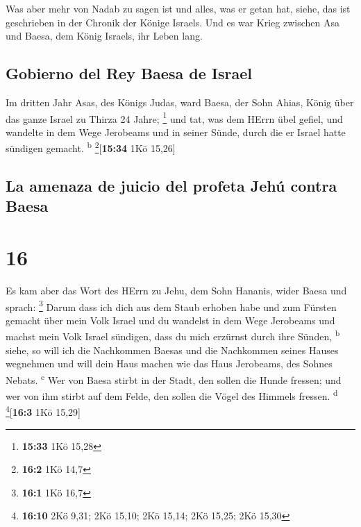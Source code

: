  Was aber mehr von Nadab zu sagen ist und alles, was er
getan hat, siehe, das ist geschrieben in der Chronik der Könige Israels.
 Und es war Krieg zwischen Asa und Baesa, dem König
Israels, ihr Leben lang.

\hypertarget{gobierno-del-rey-baesa-de-israel}{%
\subsection{Gobierno del Rey Baesa de
Israel}\label{gobierno-del-rey-baesa-de-israel}}

 Im dritten Jahr Asas, des Königs Judas, ward Baesa, der
Sohn Ahias, König über das ganze Israel zu Thirza 24 Jahre; \footnote{\textbf{15:33}
  1Kö 15,28}  und tat, was dem HErrn übel gefiel, und
wandelte in dem Wege Jerobeams und in seiner Sünde, durch die er Israel
hatte sündigen gemacht. \textsuperscript{b} \footnote{\textbf{16:2} 1Kö
  14,7}{[}\textbf{15:34} 1Kö 15,26{]}

\hypertarget{la-amenaza-de-juicio-del-profeta-jehuxfa-contra-baesa}{%
\subsection{La amenaza de juicio del profeta Jehú contra
Baesa}\label{la-amenaza-de-juicio-del-profeta-jehuxfa-contra-baesa}}

\hypertarget{section-15}{%
\section{16}\label{section-15}}

 Es kam aber das Wort des HErrn zu Jehu, dem Sohn Hananis,
wider Baesa und sprach: \footnote{\textbf{16:1} 1Kö 16,7} 
Darum dass ich dich aus dem Staub erhoben habe und zum Fürsten gemacht
über mein Volk Israel und du wandelst in dem Wege Jerobeams und machst
mein Volk Israel sündigen, dass du mich erzürnst durch ihre Sünden,
\textsuperscript{b}  siehe, so will ich die Nachkommen
Baesas und die Nachkommen seines Hauses wegnehmen und will dein Haus
machen wie das Haus Jerobeams, des Sohnes Nebats. \textsuperscript{c}
 Wer von Baesa stirbt in der Stadt, den sollen die Hunde
fressen; und wer von ihm stirbt auf dem Felde, den sollen die Vögel des
Himmels fressen. \textsuperscript{d} \footnote{\textbf{16:10} 2Kö 9,31;
  2Kö 15,10; 2Kö 15,14; 2Kö 15,25; 2Kö 15,30}{[}\textbf{16:3} 1Kö
15,29{]}

